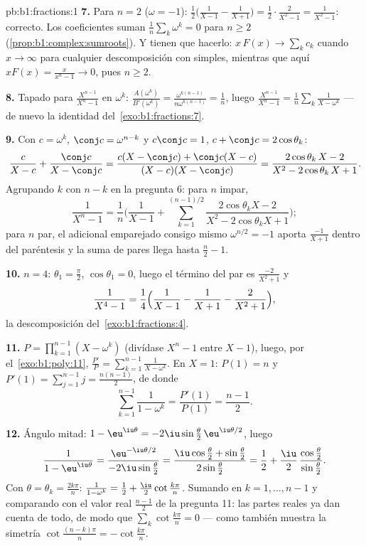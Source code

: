 \begin{solution}{pb:b1:fractions:1}
\textbf{7.} Para $n = 2$ ($\omega = -1$):
$\frac12\bigl(\frac1{X-1} - \frac1{X+1}\bigr) =
\frac12\cdot\frac{2}{X^2-1} = \frac1{X^2-1}$: correcto. Los
coeficientes suman $\frac1n\sum_k\omega^k = 0$ para $n \geq 2$
(\cref{prop:b1:complex:sumroots}). Y tienen que hacerlo:
$x\,F(x) \to \sum_k c_k$ cuando $x \to \infty$ para cualquier
descomposición con  simples, mientras que aquí
$xF(x) = \frac{x}{x^n-1} \to 0$, pues $n \geq 2$.

\textbf{8.} Tapado para $\frac{X^{n-1}}{X^n - 1}$ en $\omega^k$:
$\frac{A(\omega^k)}{B'(\omega^k)} =
\frac{\omega^{k(n-1)}}{n\omega^{k(n-1)}} = \frac1n$, luego
$\frac{X^{n-1}}{X^n-1} = \frac1n\sum_k\frac1{X - \omega^k}$ --- de
nuevo la identidad del~\cref{exo:b1:fractions:7}.

\textbf{9.} Con $c = \omega^k$, $\conj c = \omega^{n-k}$ y
$c\conj c = 1$, $c + \conj c = 2\cos\theta_k$:
\[
\frac{c}{X - c} + \frac{\conj c}{X - \conj c}
= \frac{c(X - \conj c) + \conj c(X - c)}
{(X - c)(X - \conj c)}
= \frac{2\cos\theta_k\,X - 2}{X^2 - 2\cos\theta_k\,X + 1} .
\]
Agrupando $k$ con $n - k$ en la pregunta 6: para $n$ impar,
\[
\frac1{X^n - 1} = \frac1n\Biggl(\frac1{X-1} +
\sum_{k=1}^{(n-1)/2}
\frac{2\cos\theta_k X - 2}{X^2 - 2\cos\theta_k X + 1}\Biggr) ;
\]
para $n$ par, el  adicional emparejado consigo mismo
$\omega^{n/2} = -1$ aporta $\frac{-1}{X+1}$ dentro del paréntesis y la
suma de pares llega hasta $\frac n2 - 1$.

\textbf{10.} $n = 4$: $\theta_1 = \frac\pi2$, $\cos\theta_1 = 0$, luego
el término del par es $\frac{-2}{X^2+1}$ y
\[
\frac1{X^4-1} = \frac14\Bigl(\frac1{X-1} - \frac1{X+1}
- \frac2{X^2+1}\Bigr) ,
\]
la descomposición del~\cref{exo:b1:fractions:4}.

\textbf{11.} $P = \prod_{k=1}^{n-1}(X - \omega^k)$ (divídase $X^n - 1$
entre $X - 1$), luego, por el~\cref{exo:b1:poly:11},
$\frac{P'}P = \sum_{k=1}^{n-1}\frac1{X-\omega^k}$. En $X = 1$:
$P(1) = n$ y $P'(1) = \sum_{j=1}^{n-1}j = \frac{n(n-1)}2$, de donde
\[
\sum_{k=1}^{n-1}\frac1{1 - \omega^k}
= \frac{P'(1)}{P(1)} = \frac{n-1}2 .
\]

\textbf{12.} Ángulo mitad:
$1 - \eu^{\iu\theta} = -2\iu\sin\frac\theta2\,\eu^{\iu\theta/2}$, luego
\[
\frac1{1 - \eu^{\iu\theta}}
= \frac{\eu^{-\iu\theta/2}}{-2\iu\sin\frac\theta2}
= \frac{\iu\cos\frac\theta2 + \sin\frac\theta2}
{2\sin\frac\theta2}
= \frac12 + \frac\iu2\,
\frac{\cos\frac\theta2}{\sin\frac\theta2} .
\]
Con $\theta = \theta_k = \frac{2k\pi}n$: $\frac1{1-\omega^k} =
\frac12 + \frac\iu2\cot\frac{k\pi}n$. Sumando en $k = 1, \dots, n-1$ y
comparando con el valor real $\frac{n-1}2$ de la pregunta 11: las
partes reales ya dan cuenta de todo, de modo que
$\sum_k\cot\frac{k\pi}n = 0$ --- como también muestra la simetría
$\cot\frac{(n-k)\pi}n = -\cot\frac{k\pi}n$.


\end{solution}

